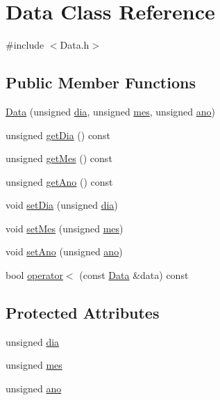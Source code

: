 \hypertarget{class_data}{\section{Data Class Reference}
\label{class_data}
}


{\ttfamily \#include $<$Data.\+h$>$}

\subsection*{Public Member Functions}
\begin{DoxyCompactItemize}
\item 
\hyperlink{class_data_ab1e8f6ca4094cbf13062f243fa2bb90b}{Data} (unsigned \hyperlink{class_data_afd7c86fbe8808298e8ac555d15374c97}{dia}, unsigned \hyperlink{class_data_a52f02cba5bf54c79dc1dd93545d27e5f}{mes}, unsigned \hyperlink{class_data_a662fc8d7cc87332b0204470c21b08383}{ano})
\item 
unsigned \hyperlink{class_data_a07fe748ec046cb904c6854fb8b792786}{get\+Dia} () const 
\item 
unsigned \hyperlink{class_data_a070387c9894b966ec8a175e3eb3c9c06}{get\+Mes} () const 
\item 
unsigned \hyperlink{class_data_a31f649c5a854de4750506a163955bb0b}{get\+Ano} () const 
\item 
void \hyperlink{class_data_ab3ea08211198373060bfd9aa7530ddff}{set\+Dia} (unsigned \hyperlink{class_data_afd7c86fbe8808298e8ac555d15374c97}{dia})
\item 
void \hyperlink{class_data_ac886172612a1bd81f1d266c4f5f94377}{set\+Mes} (unsigned \hyperlink{class_data_a52f02cba5bf54c79dc1dd93545d27e5f}{mes})
\item 
void \hyperlink{class_data_a5ad712f23c932ee4d515213f7c66f60e}{set\+Ano} (unsigned \hyperlink{class_data_a662fc8d7cc87332b0204470c21b08383}{ano})
\item 
bool \hyperlink{class_data_a54019a127c7262ad527e523b98ddd26a}{operator$<$} (const \hyperlink{class_data}{Data} \&data) const 
\end{DoxyCompactItemize}
\subsection*{Protected Attributes}
\begin{DoxyCompactItemize}
\item 
unsigned \hyperlink{class_data_afd7c86fbe8808298e8ac555d15374c97}{dia}
\item 
unsigned \hyperlink{class_data_a52f02cba5bf54c79dc1dd93545d27e5f}{mes}
\item 
unsigned \hyperlink{class_data_a662fc8d7cc87332b0204470c21b08383}{ano}
\end{DoxyCompactItemize}


